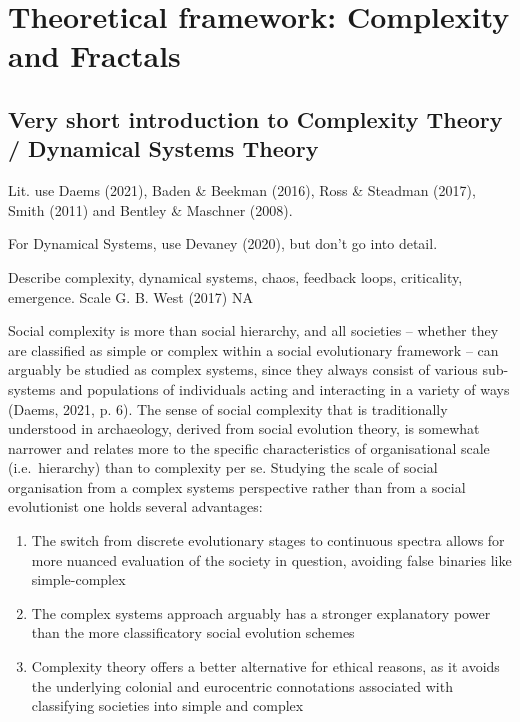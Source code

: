 \documentclass[
  12pt,
]{book}
\begin{document}
\hypertarget{theory}{%
\chapter{Theoretical framework: Complexity and Fractals}\label{theory}}

\hypertarget{very-short-introduction-to-complexity-theory-dynamical-systems-theory}{%
\section{Very short introduction to Complexity Theory / Dynamical Systems Theory}\label{very-short-introduction-to-complexity-theory-dynamical-systems-theory}}

Lit. use Daems (2021), Baden \& Beekman (2016), Ross \& Steadman (2017), Smith (2011) and Bentley \& Maschner (2008).

For Dynamical Systems, use Devaney (2020), but don't go into detail.

Describe complexity, dynamical systems, chaos, feedback loops, criticality, emergence. Scale G. B. West (2017) NA

Social complexity is more than social hierarchy, and all societies -- whether they are classified as simple or complex within a social evolutionary framework -- can arguably be studied as complex systems, since they always consist of various sub-systems and populations of individuals acting and interacting in a variety of ways (Daems, 2021, p. 6). The sense of social complexity that is traditionally understood in archaeology, derived from social evolution theory, is somewhat narrower and relates more to the specific characteristics of organisational scale (i.e.~hierarchy) than to complexity per se. Studying the scale of social organisation from a complex systems perspective rather than from a social evolutionist one holds several advantages:

\begin{enumerate}
\def\labelenumi{\arabic{enumi}.}
\item
  The switch from discrete evolutionary stages to continuous spectra allows for more nuanced evaluation of the society in question, avoiding false binaries like simple-complex
\item
  The complex systems approach arguably has a stronger explanatory power than the more classificatory social evolution schemes
\item
  Complexity theory offers a better alternative for ethical reasons, as it avoids the underlying colonial and eurocentric connotations associated with classifying societies into simple and complex
\end{enumerate}
\end{document}
